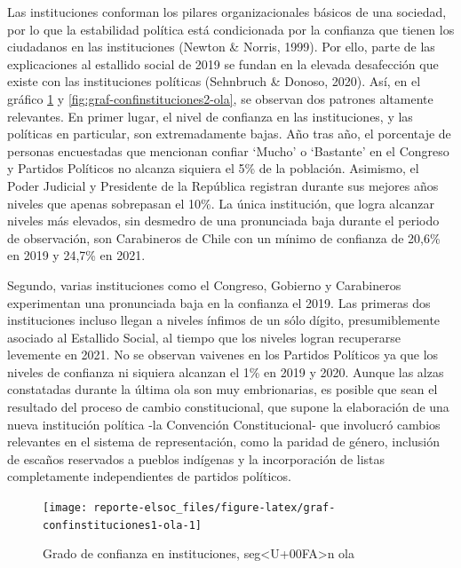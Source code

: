 \documentclass[
  12pt,
]{book}
\begin{document}
Las instituciones conforman los pilares organizacionales básicos de una sociedad, por lo que la estabilidad política está condicionada por la confianza que tienen los ciudadanos en las instituciones (Newton \& Norris, 1999). Por ello, parte de las explicaciones al estallido social de 2019 se fundan en la elevada desafección que existe con las instituciones políticas (Sehnbruch \& Donoso, 2020). Así, en el gráfico \ref{fig:graf-confinstituciones1-ola} y \ref{fig:graf-confinstituciones2-ola}, se observan dos patrones altamente relevantes. En primer lugar, el nivel de confianza en las instituciones, y las políticas en particular, son extremadamente bajas. Año tras año, el porcentaje de personas encuestadas que mencionan confiar `Mucho' o `Bastante' en el Congreso y Partidos Políticos no alcanza siquiera el 5\% de la población. Asimismo, el Poder Judicial y Presidente de la República registran durante sus mejores años niveles que apenas sobrepasan el 10\%. La única institución, que logra alcanzar niveles más elevados, sin desmedro de una pronunciada baja durante el periodo de observación, son Carabineros de Chile con un mínimo de confianza de 20,6\% en 2019 y 24,7\% en 2021.

Segundo, varias instituciones como el Congreso, Gobierno y Carabineros experimentan una pronunciada baja en la confianza el 2019. Las primeras dos instituciones incluso llegan a niveles ínfimos de un sólo dígito, presumiblemente asociado al Estallido Social, al tiempo que los niveles logran recuperarse levemente en 2021. No se observan vaivenes en los Partidos Políticos ya que los niveles de confianza ni siquiera alcanzan el 1\% en 2019 y 2020. Aunque las alzas constatadas durante la última ola son muy embrionarias, es posible que sean el resultado del proceso de cambio constitucional, que supone la elaboración de una nueva institución política -la Convención Constitucional- que involucró cambios relevantes en el sistema de representación, como la paridad de género, inclusión de escaños reservados a pueblos indígenas y la incorporación de listas completamente independientes de partidos políticos.

\begin{figure}

{\centering \texttt{[image: reporte-elsoc\_files/figure-latex/graf-confinstituciones1-ola-1]} 

}

\caption{Grado de confianza en instituciones, seg<U+00FA>n ola}\label{fig:graf-confinstituciones1-ola}
\end{figure}
\end{document}
